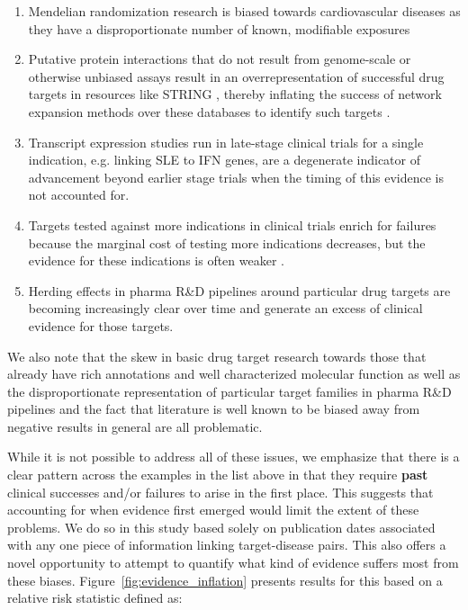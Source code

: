 \documentclass{article}
\begin{document}
\begin{enumerate}
\item Mendelian randomization research is biased towards cardiovascular diseases as they have a disproportionate number of known, modifiable exposures \cite{PMID:36736292}
\item Putative protein interactions that do not result from genome-scale or otherwise unbiased assays result in an overrepresentation of successful drug targets in resources like STRING \cite{PMID:36370105}, thereby inflating the success of network expansion methods over these databases to identify such targets \cite{Sadler2023-xd}.
\item Transcript expression studies run in late-stage clinical trials for a single indication, e.g. \cite{PMID:27723281} linking SLE to IFN genes, are a degenerate indicator of advancement beyond earlier stage trials when the timing of this evidence is not accounted for.
\item Targets tested against more indications in clinical trials enrich for failures because the marginal cost of testing more indications decreases, but the evidence for these indications is often weaker \cite{PMID:33262371}.
\item Herding effects in pharma R\&D pipelines around particular drug targets are becoming increasingly clear over time \cite{PMID:37117303} and generate an excess of clinical evidence for those targets.
\end{enumerate}

We also note that the skew in basic drug target research towards those that already have rich annotations and well characterized molecular function \cite{PMID:29358745} as well as the disproportionate representation of particular target families in pharma R\&D pipelines \cite{PMID:27910877,PPR:PPR7029} and the fact that literature is well known to be biased away from negative results in general \cite{PMID:32893970} are all problematic. 

While it is not possible to address all of these issues, we emphasize that there is a clear pattern across the examples in the list above in that they require \textbf{past} clinical successes and/or failures to arise in the first place. This suggests that accounting for when evidence first emerged would limit the extent of these problems. We do so in this study based solely on publication dates associated with any one piece of information linking target-disease pairs. This also offers a novel opportunity to attempt to quantify what kind of evidence suffers most from these biases. Figure~\ref{fig:evidence_inflation} presents results for this based on a relative risk statistic defined as:
\end{document}
